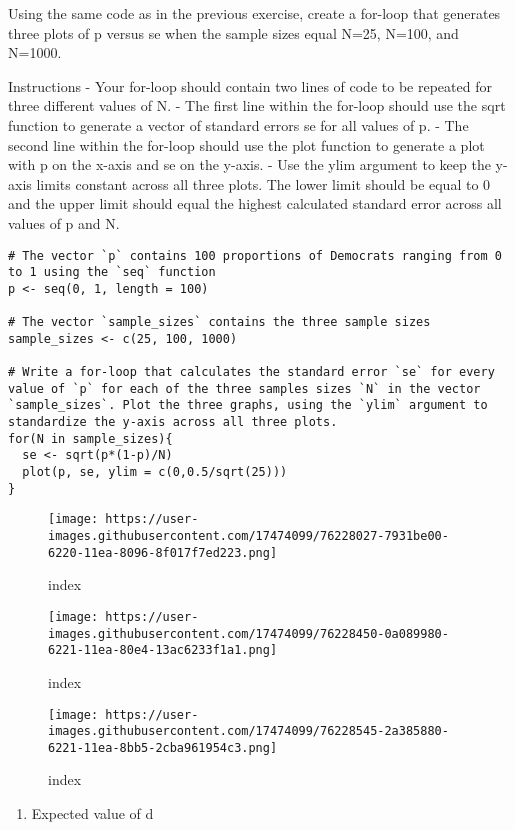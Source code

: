 \documentclass[
]{article}
\providecommand{\tightlist}{%
  \setlength{\itemsep}{0pt}\setlength{\parskip}{0pt}}
\begin{document}
Using the same code as in the previous exercise, create a for-loop that
generates three plots of p versus se when the sample sizes equal N=25,
N=100, and N=1000.

Instructions - Your for-loop should contain two lines of code to be
repeated for three different values of N. - The first line within the
for-loop should use the sqrt function to generate a vector of standard
errors se for all values of p. - The second line within the for-loop
should use the plot function to generate a plot with p on the x-axis and
se on the y-axis. - Use the ylim argument to keep the y-axis limits
constant across all three plots. The lower limit should be equal to 0
and the upper limit should equal the highest calculated standard error
across all values of p and N.

\begin{verbatim}
# The vector `p` contains 100 proportions of Democrats ranging from 0 to 1 using the `seq` function
p <- seq(0, 1, length = 100)

# The vector `sample_sizes` contains the three sample sizes
sample_sizes <- c(25, 100, 1000)

# Write a for-loop that calculates the standard error `se` for every value of `p` for each of the three samples sizes `N` in the vector `sample_sizes`. Plot the three graphs, using the `ylim` argument to standardize the y-axis across all three plots.
for(N in sample_sizes){
  se <- sqrt(p*(1-p)/N)
  plot(p, se, ylim = c(0,0.5/sqrt(25)))
}
\end{verbatim}

\begin{figure}
\centering
\texttt{[image: https://user-images.githubusercontent.com/17474099/76228027-7931be00-6220-11ea-8096-8f017f7ed223.png]}
\caption{index}
\end{figure}

\begin{figure}
\centering
\texttt{[image: https://user-images.githubusercontent.com/17474099/76228450-0a089980-6221-11ea-80e4-13ac6233f1a1.png]}
\caption{index}
\end{figure}

\begin{figure}
\centering
\texttt{[image: https://user-images.githubusercontent.com/17474099/76228545-2a385880-6221-11ea-8bb5-2cba961954c3.png]}
\caption{index}
\end{figure}

\begin{enumerate}
\def\labelenumi{\arabic{enumi}.}
\setcounter{enumi}{6}
\tightlist
\item
  Expected value of d
\end{enumerate}
\end{document}
